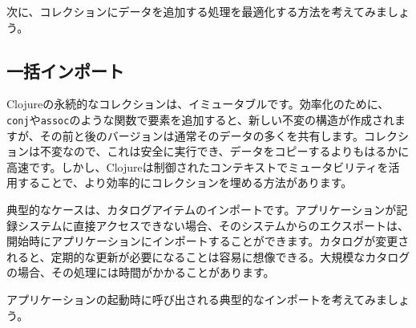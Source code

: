 次に、コレクションにデータを追加する処理を最適化する方法を考えてみましょう。


\subsection{一括インポート}

Clojureの永続的なコレクションは、イミュータブルです。効率化のために、\texttt{conj}や\texttt{assoc}のような関数で要素を追加すると、新しい不変の構造が作成されますが、その前と後のバージョンは通常そのデータの多くを共有します。コレクションは不変なので、これは安全に実行でき、データをコピーするよりもはるかに高速です。しかし、Clojureは制御されたコンテキストでミュータビリティを活用することで、より効率的にコレクションを埋める方法があります。

典型的なケースは、カタログアイテムのインポートです。アプリケーションが記録システムに直接アクセスできない場合、そのシステムからのエクスポートは、開始時にアプリケーションにインポートすることができます。カタログが変更されると、定期的な更新が必要になることは容易に想像できる。大規模なカタログの場合、その処理には時間がかかることがあります。

アプリケーションの起動時に呼び出される典型的なインポートを考えてみましょう。


\begin{lstlisting}[numbers=none]

\end{lstlisting}








\begin{lstlisting}[numbers=none]

\end{lstlisting}





